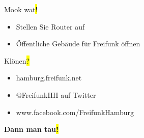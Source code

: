 \documentclass[t]{beamer}
\begin{document}
\begin{frame}{Mook wat\hl{!}}
    \begin{itemize}
        \item Stellen Sie Router auf
        \item Öffentliche Gebäude für Freifunk öffnen
    \end{itemize}
\end{frame}

\begin{frame}{Klönen\hl{?}}
    \begin{itemize}
        \item hamburg.freifunk.net
        \item @FreifunkHH auf Twitter
        \item www.facebook.com/FreifunkHamburg
    \end{itemize}
\end{frame}

\begin{frame}{}
    \vspace{1.6cm}
    \centering 
    \vspace{0.8cm}

    {\Huge\bf Dann man tau\hl{!}}
\end{frame}
\end{document}
